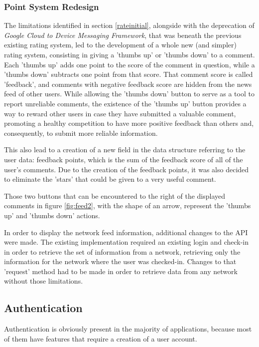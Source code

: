 \subsubsection{Point System Redesign}\label{points}

The limitations identified in section \ref{rateinitial}, alongside with the deprecation of \emph{Google Cloud to Device Messaging Framework}, that was beneath the previous existing rating system, led to the development of a whole new (and simpler) rating system, consisting in giving a 'thumbs up' or 'thumbs down' to a comment. Each 'thumbs up' adds one point to the score of the comment in question, while a 'thumbs down' subtracts one point from that score. That comment score is called 'feedback', and comments with negative feedback score are hidden from the news feed of other users. While allowing the 'thumbs down' button to serve as a tool to report unreliable comments, the existence of the 'thumbs up' button provides a way to reward other users in case they have submitted a valuable comment, promoting a healthy competition to have more positive feedback than others and, consequently, to submit more reliable information. 

This also lead to a creation of a new field in the data structure referring to the user data: feedback points, which is the sum of the feedback score of all of the user's comments. Due to the creation of the feedback points, it was also decided to eliminate the 'stars' that could be given to a very useful comment.

Those two buttons that can be encountered to the right of the displayed comments in figure \ref{fig:feed2}, with the shape of an arrow, represent the 'thumbs up' and 'thumbs down' actions.

In order to display the network feed information, additional changes to the API were made. The existing implementation required an existing login and check-in in order to retrieve the set of information from a network, retrieving only the information for the network where the user was checked-in. Changes to that 'request' method had to be made in order to retrieve data from any network without those limitations.

\subsection{Authentication}\label{authentication}

Authentication is obviously present in the majority of applications, because most of them have features that require a creation of a user account.

